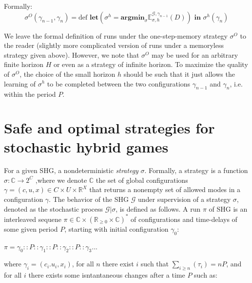     Formally:
    \begin{equation*}
        \sigma^O (\gamma_{n-1},\gamma_{n}) = \text{def } \textbf{let}(\sigma^h = \textbf{argmin}_{\sigma}\mathbb{E}^{\mathcal{G},\gamma_{n-1}}_{\sigma,h}(D) ) \textbf{ in } \sigma^h(\gamma_n) 
    \end{equation*}

    We leave the formal definition of runs under the one-step-memory strategy $\sigma^O$
    to the reader (slightly more complicated version of runs under a memoryless strategy given above).
    However, we note that $\sigma^O$ may be used for an arbitrary finite horizon $H$ or 
    even as a strategy of infinite horizon. To maximize the quality of $\sigma^O$, the choice
    of the small horizon $h$ should be such that it just allows the learning of $\sigma^h$
    to be completed between the two configurations $\gamma_{n-1}$ and $\gamma_n$, i.e.
    within the period $P$.

    \clearpage







\section{Safe and optimal strategies for stochastic hybrid games}
    \label{sec:safeandoptimal}
    For a given \ac{SHG}, a nondeterministic \emph{strategy} $\sigma$.
    Formally, a strategy is a function $\sigma: \mathbb{C} \rightarrow 2^C$
    ,where we denote $\mathbb{C}$ the set of global configurations 
    $\gamma = (c,u,x) \in C \times U \times \mathbb{R}^X$
    that returns a nonempty set of allowed modes in a configuration  
    $\gamma$.
    The behavior of the \ac{SHG} $\mathcal{G}$ under supervision of a 
    strategy $\sigma$, denoted as the stochastic process $\mathcal{G}|\sigma$,
    is defined as follows. A run $\pi$ of \ac{SHG} is an interleaved 
    sequene $\pi \in \mathbb{C} \times (\mathbb{R}_{\geqslant 0} 
    \times \mathbb{C})^{*}$ of configurations and time-delays of 
    some given period $P$, starting with initial configuration $\gamma_0$: 
    \begin{center}
      $\pi = \gamma_0 :: P :: \gamma_1 :: P :: \gamma_2 :: P :: \gamma_3 ...$  
    \end{center}
    where $\gamma_i=(c_i.u_i,x_i)$, for all $n$ there exist $i$
    such that $\sum_{i \geqslant n}(\tau_i) = nP$, and for all $i$
    there exists some isntantaneous changes after a time $P$ such as:

